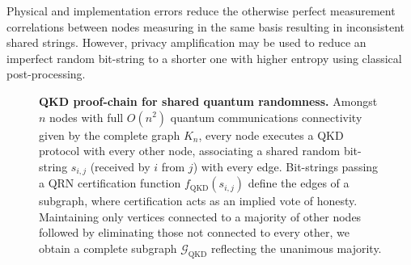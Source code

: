Physical and implementation errors reduce the otherwise perfect measurement correlations between nodes measuring in the same basis resulting in inconsistent shared strings. However, privacy amplification \cite{PrivacyAmp} may be used to reduce an imperfect random bit-string to a shorter one with higher entropy using classical post-processing.

%



\begin{figure}[!htb]
	
	\caption{\textbf{QKD proof-chain for shared quantum randomness.} Amongst $n$ nodes with full $O(n^2)$ quantum communications connectivity given by the complete graph $K_n$, every node executes a QKD protocol with every other node, associating a shared random bit-string $s_{i,j}$ (received by $i$ from $j$) with every edge. Bit-strings passing a QRN certification function $f_\mathrm{QKD}(s_{i,j})$ define the edges of a subgraph, where certification acts as an implied vote of honesty. Maintaining only vertices connected to a majority of other nodes followed by eliminating those not connected to every other, we obtain a complete subgraph $\mathcal{G}_\mathrm{QKD}$ reflecting the unanimous majority.} \label{fig:proof_chains_QKD}
\end{figure}

